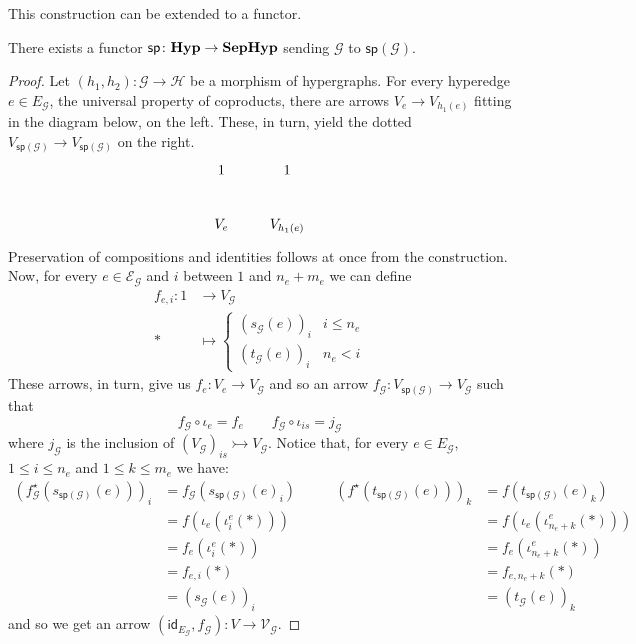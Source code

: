 \documentclass[3p]{elsarticle}
\newcommand{\catname}[1]{\textbf{\textup{#1}}}
\newcommand{\hyp}{\catname{Hyp}}
\newcommand{\shyp}{\catname{SepHyp}}
\renewcommand{\sp}{\mathsf{sp}}
\newcommand{\is}[1]{{#1}_{is}}
\newcommand{\mto}{\rightarrowtail}
\newcommand{\id}[1]{\mathsf{id}_{#1}}
\theoremstyle{remark}
\theoremstyle{definition}
\begin{document}
This construction can be extended to a functor.

\begin{prop}There exists a functor $\sp \colon \hyp\to \shyp$ sending $\mathcal{G}$ to $\sp(\mathcal{G})$.
\end{prop}
\begin{proof}
Let $(h_1, h_2)\colon \mathcal{G}\to \mathcal{H}$ be a morphism of hypergraphs.  For every hyperedge $e\in E_{\mathcal{G}}$,
the universal property of coproducts, there are arrows $V_e\to V_{h_1(e)}$ fitting in the diagram below, on the left. These, in turn, yield the dotted $V_{\sp(\mathcal{G})} \to V_{\sp(\mathcal{G})}$ on the right.
\[\xymatrix{1 & 1 \\ V_{e} & V_{h_1(e)} }\]
Preservation of compositions and identities follows at once from the construction.
Now, for every $e\in \mathcal{E}_\mathcal{G}$ and $i$ between $1$ and $n_e+m_e$  we can define 
\begin{align*}f_{e, i}\colon 1&\to V_{\mathcal{G}}\\
	* & \mapsto\begin{cases}
		(s_{\mathcal{G}}(e))_i & i \leq n_e\\
		(t_{\mathcal{G}}(e))_i & n_e < i
	\end{cases}
\end{align*}
These arrows, in turn, give us $f_ e\colon V_e\to V_{\mathcal{G}} $ and so an arrow $f_{\mathcal{G}}:V_{\sp(\mathcal{G})}\to V_{\mathcal{G}}$ such that 
\[f_{\mathcal{G}}\circ \iota_e = f_e \qquad f_{\mathcal{G}}\circ \is{\iota} =  j_{\mathcal{G}}\]
where $j_{\mathcal{G}}$ is the inclusion of $\is{(V_{\mathcal{G}})}\mto V_{\mathcal{G}}$. Notice that, for every $e\in E_{\mathcal{G}}$, $1\leq i\leq n_e$ and $1\leq k\leq m_e$ we have:
\[\begin{split}
	(f_{\mathcal{G}}^\star( s_{\sp(\mathcal{G})}(e)) )_i & = f_{\mathcal{G}}( s_{\sp(\mathcal{G})}(e) _i)\\
	&=f(\iota_e(\iota^e_i(*)))\\&=f_e(\iota^e_i(*))\\&=f_{e, i}(*)\\&=
	(s_{\mathcal{G}}(e))_i 
\end{split} \qquad 
\begin{split}
	(f^\star( t_{\sp(\mathcal{G})}(e)) )_k & = f( t_{\sp(\mathcal{G})}(e) _k)\\
	&=f(\iota_e(\iota^e_{n_e+k}(*)))\\&=f_e(\iota^e_{n_e+k}(*))\\&=f_{e, n_e+k}(*)\\&=
	(t_{\mathcal{G}}(e))_k
\end{split}
\]
and so we get an arrow $(\id{E_{\mathcal{G}}}, f_{\mathcal{G}})\colon V\to \mathcal{V}_{\mathcal{G}}$. 
\end{proof} 
\end{document}

